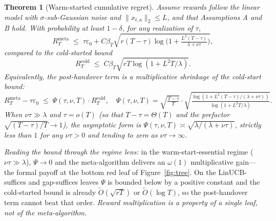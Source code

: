 \documentclass{article}
\newtheorem{theorem}{Theorem}
\theoremstyle{definition}
\theoremstyle{remark}
\theoremstyle{remark}
\begin{document}
\begin{theorem}[Warm-started cumulative regret]
\label{thm:warm-start-regret}
Assume rewards follow the linear model with $\sigma$-sub-Gaussian noise and
$\|x_{t,a}\|_2\!\le\!L$, and that Assumptions A and B hold. With probability
at least $1-\delta$, for any realization of $\tau$,
\begin{equation}
\label{eq:warm-meta-regret}
R_T^{\mathrm{meta}}
\;\le\;
\tau\varepsilon_0
+ C\beta_T\sqrt{r(T-\tau)\log\!\bigl(1+\tfrac{L^2(T-\tau)}{\lambda+\nu\tau}\bigr)},
\end{equation}
compared to the cold-started bound
\begin{equation}
\label{eq:cold-regret}
R_T^{\mathrm{cold}}\;\le\; C\beta_T\sqrt{rT\log(1+L^2T/\lambda)}.
\end{equation}
Equivalently, the post-handover term is a multiplicative shrinkage of the
cold-start bound:
\begin{equation}
\label{eq:psi-shrinkage}
R_T^{\mathrm{meta}}-\tau\varepsilon_0\;\le\;\Psi(\tau,\nu,T)\cdot R_T^{\mathrm{cold}},
\quad
\Psi(\tau,\nu,T)
=\sqrt{\tfrac{T-\tau}{T}}\cdot
\sqrt{\tfrac{\log(1+L^2(T-\tau)/(\lambda+\nu\tau))}{\log(1+L^2T/\lambda)}}.
\end{equation}
When $\nu\tau\gg\lambda$ and $\tau=o(T)$ (so that
$T-\tau=\Theta(T)$ and the prefactor $\sqrt{(T-\tau)/T}\to 1$), the
asymptotic form is $\Psi(\tau,\nu,T)\asymp\sqrt{\lambda/(\lambda+\nu\tau)}$,
strictly less than $1$ for any $\nu\tau>0$ and tending to zero as
$\nu\tau\to\infty$.
\end{theorem}

\emph{Reading the bound through the regime lens:} in the warm-start-essential
regime ($\nu\tau\gg\lambda$), $\Psi\to 0$ and the meta-algorithm delivers an
$\omega(1)$ multiplicative gain---the formal payoff at the bottom red leaf
of Figure~\ref{fig:tree}. On the LinUCB-suffices and gap-suffices leaves
$\Psi$ is bounded below by a positive constant and the cold-started bound is
already $\widetilde O(\sqrt{rT})$ or $\widetilde O(\log T)$, so the
post-handover term cannot beat that order. \emph{Reward multiplication is a
property of a single leaf, not of the meta-algorithm.}
\end{document}
